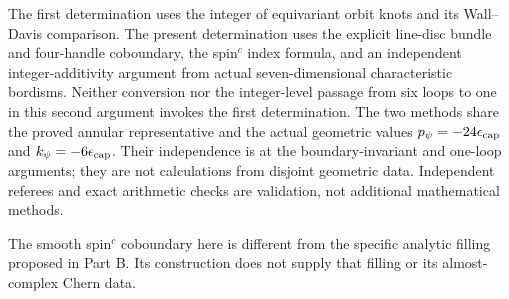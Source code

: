 \begin{remark}
The first determination uses the integer of equivariant
orbit knots and its Wall--Davis comparison. The present
determination uses the explicit line-disc bundle and
four-handle coboundary, the spin$^c$ index formula, and an
independent integer-additivity argument from actual
seven-dimensional characteristic bordisms. Neither conversion
nor the integer-level passage from six loops to one in this
second argument invokes the first determination. The two
methods share the proved annular representative and the actual
geometric values $p_\psi=-24\epsilon_{\rm cap}$ and
$k_\psi=-6\epsilon_{\rm cap}$. Their independence is at the
boundary-invariant and one-loop arguments; they are not
calculations from disjoint geometric data. Independent
referees and exact arithmetic checks are validation, not
additional mathematical methods.

The smooth spin$^c$ coboundary here is different from the
specific analytic filling proposed in Part B. Its construction
does not supply that filling or its almost-complex Chern data.
\end{remark}
